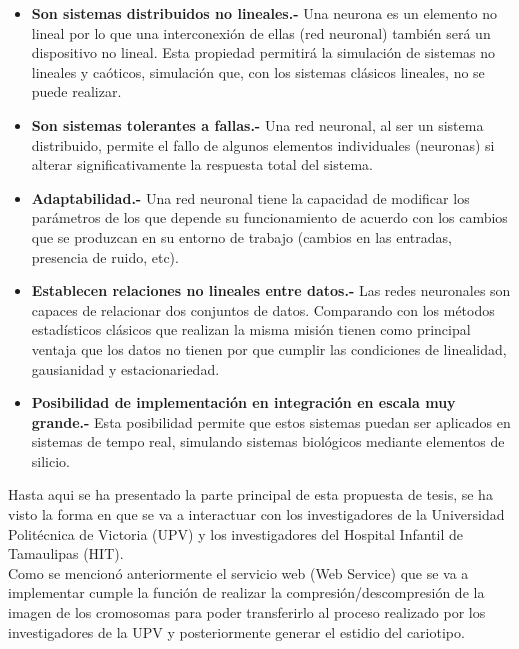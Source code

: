 \documentclass[12pt,letterpaper,titlepage]{article}
\begin{document}
\begin{itemize}
\begin{itemize}\itemsep=0pt
\item  \textbf{Son sistemas distribuidos no lineales.-} Una neurona es un elemento no lineal por lo que una interconexión	 de ellas (red neuronal) también será un dispositivo no lineal. Esta propiedad permitirá la simulación de sistemas no  lineales y caóticos, simulación que, con los sistemas clásicos lineales, no se puede realizar.
\item  \textbf{Son sistemas tolerantes a fallas.-} Una red neuronal, al ser un sistema distribuido, permite el fallo de algunos elementos individuales (neuronas) si alterar significativamente la respuesta total del sistema.
\item  \textbf{Adaptabilidad.-} Una red neuronal tiene la capacidad de modificar los parámetros de los que depende su funcionamiento de acuerdo con los cambios que se produzcan en su entorno de trabajo (cambios en las entradas, presencia de ruido, etc).
\item  \textbf{Establecen relaciones no lineales entre datos.-} Las redes neuronales son capaces de relacionar dos conjuntos de datos. Comparando con los métodos estadísticos clásicos que realizan la misma misión tienen como principal ventaja que los datos no tienen por que cumplir las condiciones de linealidad, gausianidad y estacionariedad. \cite{129}
\item  \textbf{Posibilidad de implementación en integración en escala muy grande.-} Esta posibilidad permite que estos sistemas puedan ser aplicados en sistemas de tempo real, simulando sistemas biológicos mediante elementos de silicio. \cite{130}
\end{itemize}

Hasta aqui se ha presentado la parte principal de esta propuesta de tesis, se ha visto la forma en que se va a interactuar con los investigadores de la Universidad Politécnica de Victoria (UPV) y los investigadores del Hospital Infantil de Tamaulipas (HIT).\\

Como se mencionó anteriormente el servicio web (Web Service) que se va a implementar cumple la función de realizar la compresión/descompresión de la imagen de los cromosomas para poder transferirlo al proceso realizado por los investigadores de la UPV y posteriormente generar el estidio del cariotipo.



\end{itemize}
\end{document}
